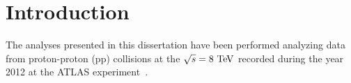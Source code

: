 \clearpage{\pagestyle{empty}\cleardoublepage}

\chapter*{Introduction}\label{chap:intro}

The analyses presented in this dissertation have been performed analyzing data from 
proton-proton (pp) collisions at the \cme $\rts=8\tev$ recorded during the year 2012 
at the ATLAS experiment~\cite{Aad:2008zzm}. 

